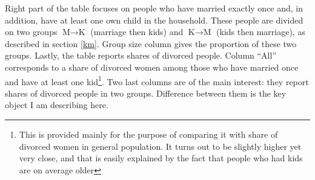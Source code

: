 \documentclass[12pt,letter]{article}
\begin{document}
Right part of the table focuses on people who have married exactly once and, in addition, have at least one own child in the household. These people are divided on two groups $\text{M}\to\text{K}$ (marriage then kids) and $\text{K}\to\text{M}$ (kids then marriage), as described in section \ref{km}. Group size column gives the proportion of these two groups. Lastly, the table reports shares of divorced people. Column ``All'' corresponds to a share of divorced women among those who have married once and have at least one kid\footnote{This is provided mainly for the purpose of comparing it with share of divorced women in general population. It turns out to be slightly higher yet very close, and that is easily explained by the fact that people who had kids are on average older}. Two last columns are of the main interest: they report shares of divorced people in two groups. Difference between them is the key object I am describing here.
\end{document}
